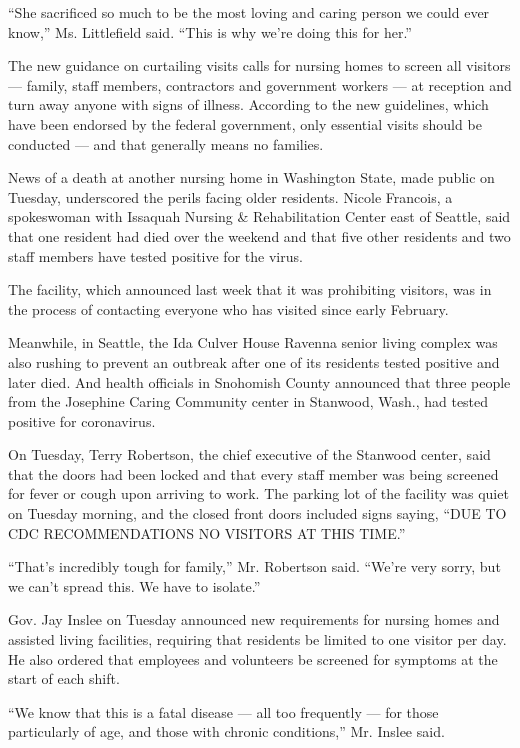 ``She sacrificed so much to be the most loving and caring person we
could ever know,'' Ms. Littlefield said. ``This is why we're doing this
for her.''

The new guidance on curtailing visits calls for nursing homes to screen
all visitors --- family, staff members, contractors and government
workers --- at reception and turn away anyone with signs of illness.
According to the new guidelines, which have been endorsed by the federal
government, only essential visits should be conducted --- and that
generally means no families.

News of a death at another nursing home in Washington State, made public
on Tuesday, underscored the perils facing older residents. Nicole
Francois, a spokeswoman with Issaquah Nursing \& Rehabilitation Center
east of Seattle, said that one resident had died over the weekend and
that five other residents and two staff members have tested positive for
the virus.

The facility, which announced last week that it was prohibiting
visitors, was in the process of contacting everyone who has visited
since early February.

Meanwhile, in Seattle, the Ida Culver House Ravenna senior living
complex was also rushing to prevent an outbreak after one of its
residents tested positive and later died. And health officials in
Snohomish County announced that three people from the Josephine Caring
Community center in Stanwood, Wash., had tested positive for
coronavirus.

On Tuesday, Terry Robertson, the chief executive of the Stanwood center,
said that the doors had been locked and that every staff member was
being screened for fever or cough upon arriving to work. The parking lot
of the facility was quiet on Tuesday morning, and the closed front doors
included signs saying, ``DUE TO CDC RECOMMENDATIONS NO VISITORS AT THIS
TIME.''

``That's incredibly tough for family,'' Mr. Robertson said. ``We're very
sorry, but we can't spread this. We have to isolate.''

Gov. Jay Inslee on Tuesday announced new requirements for nursing homes
and assisted living facilities, requiring that residents be limited to
one visitor per day. He also ordered that employees and volunteers be
screened for symptoms at the start of each shift.

``We know that this is a fatal disease --- all too frequently --- for
those particularly of age, and those with chronic conditions,'' Mr.
Inslee said.

